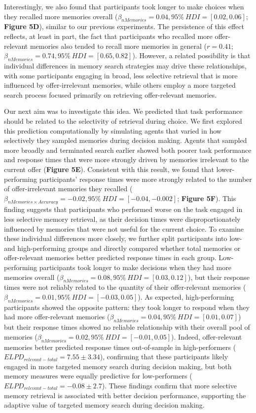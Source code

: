 \documentclass[10pt,letterpaper]{article}
\begin{document}
Interestingly, we also found that participants took longer to make choices when they recalled more memories overall ($\beta_{nMemories} = 0.04, 95\% \ HDI = [0.02, 0.06]$; \textbf{Figure 5D}), similar to our previous experiments. The persistence of this effect reflects, at least in part, the fact that participants who recalled more offer-relevant memories also tended to recall more memories in general ($r=0.41$; $\beta_{nMemories} = 0.74, 95\% \ HDI = [0.65, 0.82]$). However, a related possibility is that individual differences in memory search strategies may drive these relationships, with some participants engaging in broad, less selective retrieval that is more influenced by offer-irrelevant memories, while others employ a more targeted search process focused primarily on retrieving offer-relevant memories.

Our next aim was to investigate this idea. We predicted that task performance should be related to the selectivity of retrieval during choice. We first explored this prediction computationally by simulating agents that varied in how selectively they sampled memories during decision making. Agents that sampled more broadly and terminated search earlier showed both poorer task performance and response times that were more strongly driven by memories irrelevant to the current offer (\textbf{Figure 5E}). Consistent with this result, we found that lower-performing participants' response times were more strongly related to the number of offer-irrelevant memories they recalled ($\beta_{nMemories\times Accuracy} = -0.02, 95\% \ HDI = [-0.04, -0.002]$; \textbf{Figure 5F}). This finding suggests that participants who performed worse on the task engaged in less selective memory retrieval, as their decision times were disproportionately influenced by memories that were not useful for the current choice. To examine these individual differences more closely, we further split participants into low- and high-performing groups and directly compared whether total memories or offer-relevant memories better predicted response times in each group. Low-performing participants took longer to make decisions when they had more memories overall ($\beta_{nMemories} = 0.08, 95\% \ HDI = [0.03, 0.12]$), but their response times were not reliably related to the quantity of their offer-relevant memories ($\beta_{nMemories} = 0.01, 95\% \ HDI = [-0.03, 0.05]$). As expected, high-performing participants showed the opposite pattern: they took longer to respond when they had more offer-relevant memories ($\beta_{nMemories} = 0.04, 95\% \ HDI = [0.01, 0.07]$) but their response times showed no reliable relationship with their overall pool of memories ($\beta_{nMemories} = 0.02, 95\% \ HDI = [-0.01, 0.05]$). Indeed, offer-relevant memories better predicted response times out-of-sample in high-performers ($ELPD_{relevant-total} = 7.55 \pm 3.34$), confirming that these participants likely engaged in more targeted memory search during decision making, but both memory measures were equally predictive for low-performers ($ELPD_{relevant-total} = -0.08 \pm 2.7$). These findings confirm that more selective memory retrieval is associated with better decision performance, supporting the adaptive value of targeted memory search during decision making.
\end{document}
